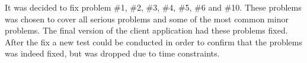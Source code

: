 It was decided to fix problem \#1, \#2, \#3, \#4, \#5, \#6 and \#10. These problems was chosen to cover all serious problems and some of the most common minor problems. The final version of the client application had these problems fixed. After the fix a new test could be conducted in order to confirm that the problems was indeed fixed, but was dropped due to time constraints.
